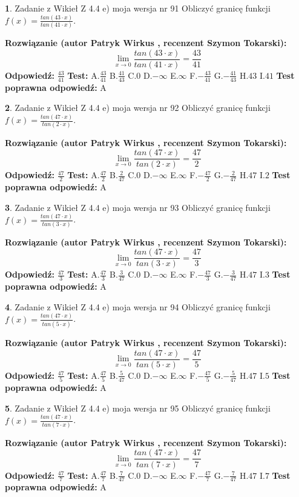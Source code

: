 \documentclass[12pt, a4paper]{article}
\theoremstyle{definition} %
\newtheorem{zad}{}
\newcommand{\zadStart}[1]{\begin{zad}#1\newline}
\newcommand{\zadStop}{\end{zad}}
\newcommand{\rozwStart}[2]{\noindent \textbf{Rozwiązanie (autor #1 , recenzent #2): }\newline}
\newcommand{\rozwStop}{\newline}
\newcommand{\odpStart}{\noindent \textbf{Odpowiedź:}\newline}
\newcommand{\odpStop}{\newline}
\newcommand{\testStart}{\noindent \textbf{Test:}\newline}
\newcommand{\testStop}{\newline}
\newcommand{\kluczStart}{\noindent \textbf{Test poprawna odpowiedź:}\newline}
\newcommand{\kluczStop}{\newline}
\begin{document}
\zadStart{Zadanie z Wikieł Z 4.4 e) moja wersja nr 91}
Obliczyć granicę funkcji $f(x)=\frac{tan(43\cdot x)}{tan(41\cdot x)}$.
\zadStop
\rozwStart{Patryk Wirkus}{Szymon Tokarski}
$$\lim\limits_{x\to 0}\frac{tan(43\cdot x)}{tan(41\cdot x)}=
\frac{43}{41}$$
\rozwStop
\odpStart
$\frac{43}{41}$
\odpStop
\testStart
A.$\frac{43}{41}$
B.$\frac{41}{43}$
C.$0$
D.$-\infty$
E.$\infty$
F.$-\frac{43}{41}$
G.$-\frac{41}{43}$
H.$43$
I.$41$
\testStop
\kluczStart
A
\kluczStop



\zadStart{Zadanie z Wikieł Z 4.4 e) moja wersja nr 92}
Obliczyć granicę funkcji $f(x)=\frac{tan(47\cdot x)}{tan(2\cdot x)}$.
\zadStop
\rozwStart{Patryk Wirkus}{Szymon Tokarski}
$$\lim\limits_{x\to 0}\frac{tan(47\cdot x)}{tan(2\cdot x)}=
\frac{47}{2}$$
\rozwStop
\odpStart
$\frac{47}{2}$
\odpStop
\testStart
A.$\frac{47}{2}$
B.$\frac{2}{47}$
C.$0$
D.$-\infty$
E.$\infty$
F.$-\frac{47}{2}$
G.$-\frac{2}{47}$
H.$47$
I.$2$
\testStop
\kluczStart
A
\kluczStop



\zadStart{Zadanie z Wikieł Z 4.4 e) moja wersja nr 93}
Obliczyć granicę funkcji $f(x)=\frac{tan(47\cdot x)}{tan(3\cdot x)}$.
\zadStop
\rozwStart{Patryk Wirkus}{Szymon Tokarski}
$$\lim\limits_{x\to 0}\frac{tan(47\cdot x)}{tan(3\cdot x)}=
\frac{47}{3}$$
\rozwStop
\odpStart
$\frac{47}{3}$
\odpStop
\testStart
A.$\frac{47}{3}$
B.$\frac{3}{47}$
C.$0$
D.$-\infty$
E.$\infty$
F.$-\frac{47}{3}$
G.$-\frac{3}{47}$
H.$47$
I.$3$
\testStop
\kluczStart
A
\kluczStop



\zadStart{Zadanie z Wikieł Z 4.4 e) moja wersja nr 94}
Obliczyć granicę funkcji $f(x)=\frac{tan(47\cdot x)}{tan(5\cdot x)}$.
\zadStop
\rozwStart{Patryk Wirkus}{Szymon Tokarski}
$$\lim\limits_{x\to 0}\frac{tan(47\cdot x)}{tan(5\cdot x)}=
\frac{47}{5}$$
\rozwStop
\odpStart
$\frac{47}{5}$
\odpStop
\testStart
A.$\frac{47}{5}$
B.$\frac{5}{47}$
C.$0$
D.$-\infty$
E.$\infty$
F.$-\frac{47}{5}$
G.$-\frac{5}{47}$
H.$47$
I.$5$
\testStop
\kluczStart
A
\kluczStop



\zadStart{Zadanie z Wikieł Z 4.4 e) moja wersja nr 95}
Obliczyć granicę funkcji $f(x)=\frac{tan(47\cdot x)}{tan(7\cdot x)}$.
\zadStop
\rozwStart{Patryk Wirkus}{Szymon Tokarski}
$$\lim\limits_{x\to 0}\frac{tan(47\cdot x)}{tan(7\cdot x)}=
\frac{47}{7}$$
\rozwStop
\odpStart
$\frac{47}{7}$
\odpStop
\testStart
A.$\frac{47}{7}$
B.$\frac{7}{47}$
C.$0$
D.$-\infty$
E.$\infty$
F.$-\frac{47}{7}$
G.$-\frac{7}{47}$
H.$47$
I.$7$
\testStop
\kluczStart
A
\kluczStop
\end{document}
